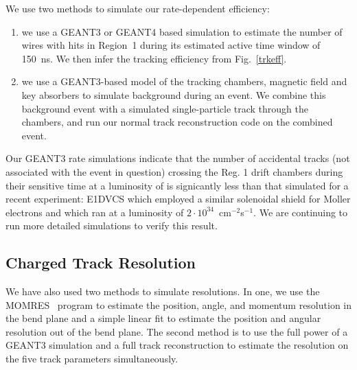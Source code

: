 We use two methods to simulate our rate-dependent efficiency:

\begin{enumerate}
\item we use a GEANT3 or GEANT4 based simulation to estimate the number
of wires with hits in Region~1 during its estimated active time window
of 150~ns.  We then infer the tracking efficiency from Fig.~\ref{trkeff}.

\item we use a GEANT3-based model of the tracking chambers, magnetic
field and key absorbers to simulate background during an event.  We
combine this background event with a simulated single-particle track
through the chambers, and run our normal track reconstruction code on
the combined event.
\end{enumerate}

Our GEANT3 rate simulations indicate that the number of accidental tracks
(not associated with the event in question) crossing the Reg. 1
drift chambers during their sensitive time at a luminosity of 
is signicantly less than that simulated for a recent experiment:
E1DVCS which employed a similar solenoidal shield for Moller electrons
and which ran at a luminosity of $2\cdot 10^{34}$~cm$^{-2}$s$^{-1}$.
We are continuing to run more detailed simulations to verify this
result.

\subsection{Charged Track Resolution}

We have also used two methods to simulate resolutions.  In one, we use the 
MOMRES~\cite{momres} program to estimate the position, angle, and momentum 
resolution in the bend plane and a simple linear fit to estimate the position 
and angular resolution out of the bend plane.  The second method is to use 
the full power of a GEANT3 simulation and a full track reconstruction to 
estimate the resolution on the five track parameters simultaneously.

